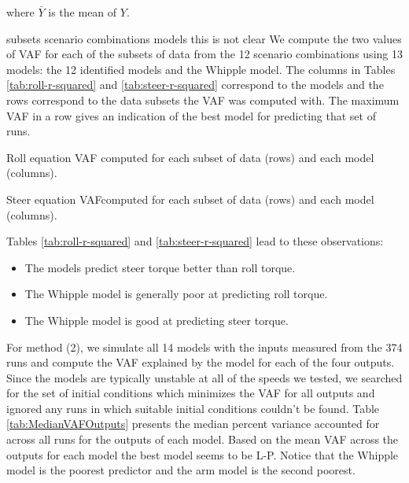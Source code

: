 \documentclass[a4paper]{article}
\begin{document}
where $\bar{Y}$ is the mean of $Y$.

subsets scenario  combinations  models   this is not clear
We compute the two values of VAF for each of the subsets of data from the 12
scenario combinations using 13 models: the 12 identified models and the Whipple
model. The columns in Tables \ref{tab:roll-r-squared} and
\ref{tab:steer-r-squared} correspond to the models and the rows correspond to
the data subsets the VAF was computed with. The maximum VAF in a row gives an
indication of the best model for predicting that set of runs.

\begin{table}
  \caption{Roll equation VAF computed for each subset of data (rows)
  and each model (columns).}
  \label{tab:roll-r-squared}
  \tiny
  
\end{table}

\begin{table}
  \caption{Steer equation VAFcomputed for each subset of data (rows)
  and each model (columns).}
  \label{tab:steer-r-squared}
  \tiny
  
\end{table}

Tables \ref{tab:roll-r-squared} and \ref{tab:steer-r-squared} lead to these
observations:

\begin{itemize}
  \item
    The models predict steer torque better than roll torque.
  \item
    The Whipple model is generally poor at predicting roll torque.
  \item
    The Whipple model is good at predicting steer torque.
\end{itemize}



For method (2), we simulate all 14 models with the inputs measured from the 374
runs and compute the VAF explained by the model for each of the four outputs.
Since the models are typically unstable at all of the speeds we tested, we
searched for the set of initial conditions which minimizes the VAF for all
outputs and ignored any runs in which suitable initial conditions couldn't be
found. Table \ref{tab:MedianVAFOutputs} presents the median percent variance
accounted for across all runs for the outputs of each model. Based on the mean
VAF across the outputs for each model the best model seems to be L-P. Notice
that the Whipple model is the poorest predictor and the arm model is the second
poorest.
\end{document}
